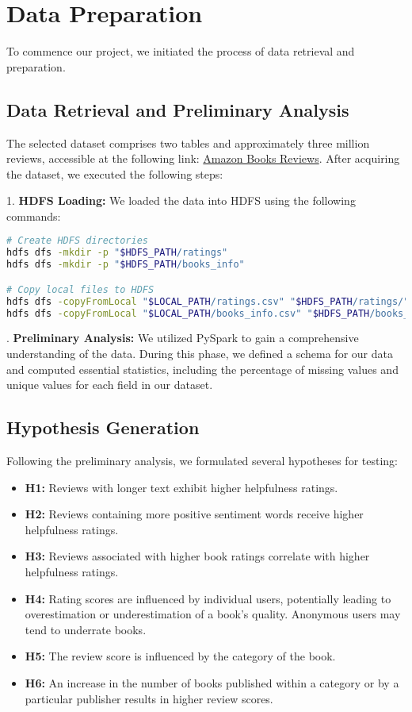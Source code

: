 \section{Data Preparation}
To commence our project, we initiated the process of data retrieval and preparation.

\subsection*{Data Retrieval and Preliminary Analysis}
The selected dataset comprises two tables and approximately three million reviews, accessible at the following link: \href{https://www.kaggle.com/datasets/mohamedbakhet/amazon-books-reviews}{Amazon Books Reviews}. 
After acquiring the dataset, we executed the following steps:\\
\noindent

1. \textbf{HDFS Loading:} We loaded the data into HDFS using the following commands:

\begin{lstlisting}[language=bash, frame=single, basicstyle=\footnotesize\ttfamily, breaklines=true]
# Create HDFS directories
hdfs dfs -mkdir -p "$HDFS_PATH/ratings"
hdfs dfs -mkdir -p "$HDFS_PATH/books_info"

# Copy local files to HDFS
hdfs dfs -copyFromLocal "$LOCAL_PATH/ratings.csv" "$HDFS_PATH/ratings/"
hdfs dfs -copyFromLocal "$LOCAL_PATH/books_info.csv" "$HDFS_PATH/books_info/"
\end{lstlisting}

. \textbf{Preliminary Analysis:} We utilized PySpark to gain a comprehensive understanding of the data. During this phase, we defined a schema for our data and computed essential statistics, including the percentage of missing values and unique values for each field in our dataset.

\subsection*{Hypothesis Generation}
Following the preliminary analysis, we formulated several hypotheses for testing:

\begin{itemize}[leftmargin=*, noitemsep]
    \item \textbf{H1:} Reviews with longer text exhibit higher helpfulness ratings.
    \item \textbf{H2:} Reviews containing more positive sentiment words receive higher helpfulness ratings.
    \item \textbf{H3:} Reviews associated with higher book ratings correlate with higher helpfulness ratings.
    \item \textbf{H4:} Rating scores are influenced by individual users, potentially leading to overestimation or underestimation of a book's quality. Anonymous users may tend to underrate books.
    \item \textbf{H5:} The review score is influenced by the category of the book.
    \item \textbf{H6:} An increase in the number of books published within a category or by a particular publisher results in higher review scores.
\end{itemize}

